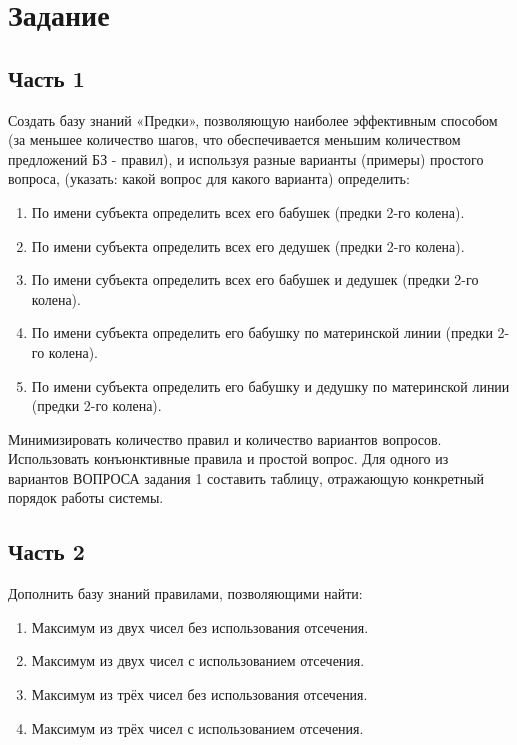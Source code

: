 \section*{Задание}

\subsection*{Часть 1}
Создать базу знаний  «Предки», позволяющую наиболее эффективным способом (за   меньшее   количество   шагов,   что   обеспечивается   меньшим   количеством предложений БЗ - правил), и используя разные варианты (примеры) простого вопроса, (указать: какой вопрос для какого варианта) определить:
\begin{enumerate}
	\item По имени субъекта определить всех его бабушек (предки 2-го колена).
	\item По имени субъекта определить всех его дедушек (предки 2-го колена).
	\item По имени субъекта определить всех его бабушек и дедушек (предки 2-го
колена).
	\item По имени субъекта определить его бабушку по материнской линии (предки 2-го
колена).
	\item По имени субъекта определить его бабушку и дедушку по материнской линии
(предки 2-го колена).
\end{enumerate}

Минимизировать количество правил и количество вариантов вопросов. Использовать
конъюнктивные правила и простой вопрос. Для одного из вариантов ВОПРОСА задания 1
составить таблицу, отражающую конкретный порядок работы системы.

\subsection*{Часть 2}

Дополнить базу знаний правилами, позволяющими найти:
\begin{enumerate}
	\item Максимум из двух чисел без использования отсечения.
	\item Максимум из двух чисел с использованием отсечения.
	\item Максимум из трёх чисел без использования отсечения.
	\item Максимум из трёх чисел с использованием отсечения.
\end{enumerate}

